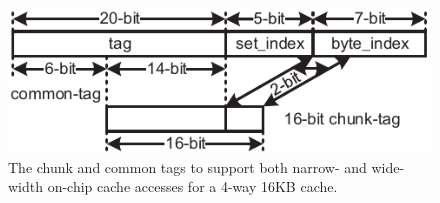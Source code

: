 
\begin{figure}
\center
\includegraphics[width=1.0\linewidth]{./fig/chunk_tag_16bit-eps-converted-to.pdf}
\caption{The chunk and common tags to support both narrow- and wide-width on-chip cache accesses for a 4-way 16KB cache.}
\label{fig:elastic-cache}
\end{figure}

